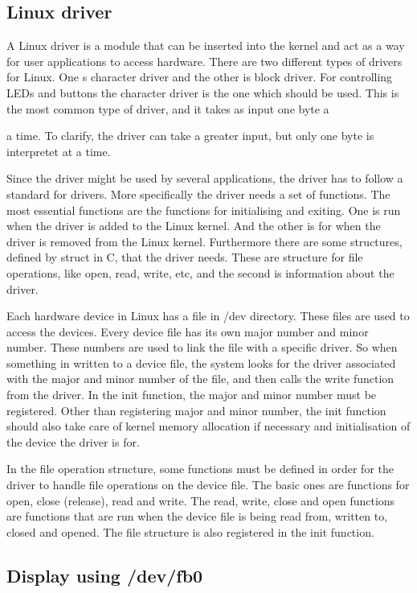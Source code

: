 \documentclass[12pt,a4paper,final]{report}
\numberwithin{equation}{section}
\numberwithin{table}{section}
\numberwithin{figure}{section}
\begin{document}
\subsection{Linux driver}
\label{sec:linuxdriver}

A Linux driver is a module that can be inserted into the kernel and act as a way for user applications to access hardware. There are two different types of drivers for Linux. One s character driver and the other is block driver. For controlling LEDs and buttons the character driver is the one which should be used. This is the most common type of driver, and it takes as input one byte a

a time. To clarify, the driver can take a greater input, but only one byte is interpretet at a time.

Since the driver might be used by several applications, the driver has to follow a standard for drivers. More specifically the driver needs a set of functions. The most essential functions are the functions for initialising and exiting. One is run when the driver is added to the Linux kernel. And the other is for when the driver is removed from the Linux kernel. Furthermore there are some structures, defined by struct in C,  that the driver needs. These are structure for file operations, like open, read, write, etc, and the second is information about the driver.

Each hardware device in Linux has a file in /dev directory. These files are used to access the devices. Every device file has its own major number and minor number. These numbers are used to link the file with a specific driver. So when something in written to a device file, the system looks for the driver associated with the major and minor number of the file, and then calls the write function from the driver. In the init function, the major and minor number must be registered. Other than registering major and minor number, the init function should also take care of kernel memory allocation if necessary and initialisation of the device the driver is for.

In the file operation structure, some functions must be defined in order for the driver to handle file operations on the device file. The basic ones are functions for open, close (release), read and write. The read, write, close and open functions are functions that are run when the device file is being read from, written to, closed and opened. The file structure is also registered in the init function.


\subsection{Display using /dev/fb0}
\label{sec:displayfb0}
\end{document}
